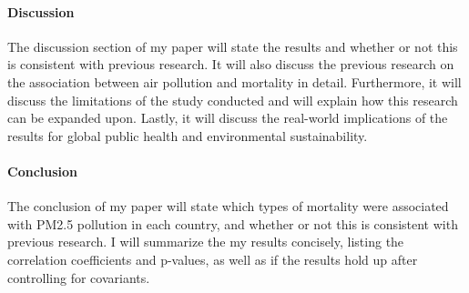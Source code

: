\documentclass[12pt]{article}\usepackage[]{graphicx}\usepackage[]{xcolor}
\begin{document}
\paragraph{Discussion}
The discussion section of my paper will state the results and whether or not this is consistent with previous research. It will also discuss the previous research on the association between air pollution and mortality in detail. Furthermore, it will discuss the limitations of the study conducted and will explain how this research can be expanded upon. Lastly, it will discuss the real-world implications of the results for global public health and environmental sustainability.

\paragraph{Conclusion}
The conclusion of my paper will state which types of mortality were associated with PM2.5 pollution in each country, and whether or not this is consistent with previous research. I will summarize the my results concisely, listing the correlation coefficients and p-values, as well as if the results hold up after controlling for covariants.


\end{document}
